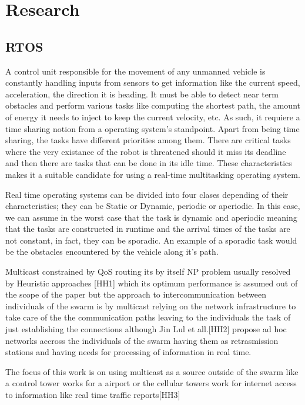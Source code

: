 \documentclass[journal]{IEEEtran}
\begin{document}
\section{Research}
\subsection{RTOS}
A control unit responsible for the movement of any unmanned vehicle is constantly handling inputs from sensors to get information like the current speed, acceleration, the direction it is heading. It must be able to detect near term obstacles and perform various tasks like computing the shortest path, the amount of energy it needs to inject to keep the current velocity, etc. As such, it requiere a time sharing notion from a operating system's standpoint. Apart from being time sharing, the tasks have different priorities among them. There are critical tasks where the very existance of the robot is threatened should it miss its deadline and then there are tasks that can be done in its idle time. These characteristics makes it a suitable candidate for using a real-time multitasking operating system.

Real time operating systems can be divided into four clases depending of their characteristics; they can be Static or Dynamic, periodic or aperiodic. In this case, we can assume in the worst case that the task is dynamic and aperiodic meaning that the tasks are constructed in runtime and the arrival times of the tasks are not constant, in fact, they can be sporadic. An example of a sporadic task would be the obstacles encountered by the vehicle along it's path.

Multicast constrained by QoS routing its by itself NP problem usually resolved by Heuristic approaches [HH1] which its optimum performance is assumed out of the scope of the paper but the approach to  intercommunication between individuals of the swarm is by multicast relying on the network infrastructure to take care of the the communication paths leaving to the individuals the task of just establishing the connections although Jin Lul et all.[HH2] propose ad hoc networks accross the individuals of the swarm having them as retrasmission stations and having needs for processing of information in real time.


The focus of this work is on using multicast as a source outside of the swarm like a control tower works for a airport or the cellular towers work for internet access to information like real time traffic reports[HH3]
\end{document}
